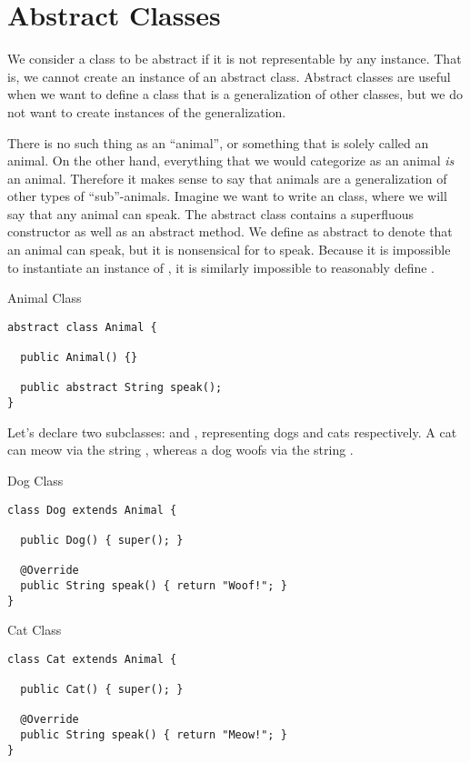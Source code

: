 \section{Abstract Classes}

We consider a class to be abstract if it is not representable by any instance. That is, we cannot create an instance of an abstract class. Abstract classes are useful when we want to define a class that is a generalization of other classes, but we do not want to create instances of the generalization.

 There is no such thing as an ``animal'', or something that is solely called an animal. On the other hand, everything that we would categorize as an animal \textit{is} an animal. Therefore it makes sense to say that animals are a generalization of other types of ``sub''-animals. Imagine we want to write an  class, where we will say that any animal can speak. The abstract class contains a superfluous constructor as well as an abstract  method. We define  as abstract to denote that an animal can speak, but it is nonsensical for  to speak. Because it is impossible to instantiate an instance of , it is similarly impossible to reasonably define .

\begin{cl}{Animal Class}
\begin{lstlisting}[language=MyJava]
abstract class Animal {

  public Animal() {} 

  public abstract String speak();
}
\end{lstlisting}
\end{cl}

Let's declare two subclasses:  and , representing dogs and cats respectively. A cat can meow via the string , whereas a dog woofs via the string . 

\begin{cl}{Dog Class}
\begin{lstlisting}[language=MyJava]
class Dog extends Animal {

  public Dog() { super(); }

  @Override
  public String speak() { return "Woof!"; }
}
\end{lstlisting}
\end{cl}

\begin{cl}{Cat Class}
\begin{lstlisting}[language=MyJava]
class Cat extends Animal {

  public Cat() { super(); }

  @Override
  public String speak() { return "Meow!"; }
}
\end{lstlisting}
\end{cl}

